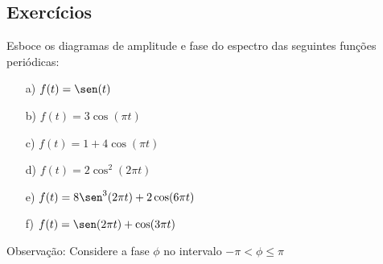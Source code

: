 \subsection*{Exercícios}
\begin{exer}
Esboce os diagramas de amplitude e fase do espectro das seguintes funções periódicas:
\begin{itemize}
\item[a)] $f(t)=\sen(t)$\
\item[b)] $f(t)=3\cos(\pi t)$
\item[c)] $f(t)=1+4\cos(\pi t)$
\item[d)] $f(t)=2\cos^2(2\pi t)$
\item[e)] $f(t)=8\sen^3(2\pi t)+2\cos(6\pi t)$
\item[f)] $f(t)=\sen(2\pi t)+\cos(3\pi t)$
\end{itemize}
Observação: Considere a fase $\phi$ no intervalo $-\pi< \phi\leq \pi$
\end{exer}
